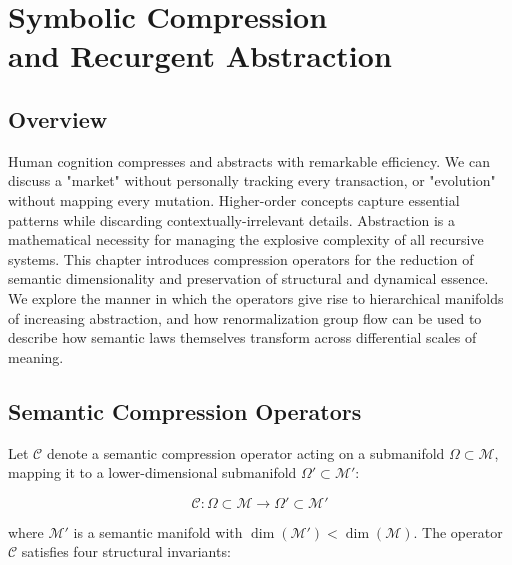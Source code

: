 \chapter{Symbolic Compression \\ and Recurgent Abstraction}

\section{Overview}

Human cognition compresses and abstracts with remarkable efficiency. We can discuss a "market" without personally tracking every transaction, or "evolution" without mapping every mutation. Higher-order concepts capture essential patterns while discarding contextually-irrelevant details. Abstraction is a mathematical necessity for managing the explosive complexity of all recursive systems. This chapter introduces compression operators for the reduction of semantic dimensionality and preservation of structural and dynamical essence. We explore the manner in which the operators give rise to hierarchical manifolds of increasing abstraction, and how renormalization group flow can be used to describe how semantic laws themselves transform across differential scales of meaning.

\section{Semantic Compression Operators}

Let \(\mathcal{C}\) denote a semantic compression operator acting on a submanifold \(\Omega \subset \mathcal{M}\), mapping it to a lower-dimensional submanifold \(\Omega' \subset \mathcal{M}'\):

\begin{equation}
\mathcal{C}: \Omega \subset \mathcal{M} \longrightarrow \Omega' \subset \mathcal{M}'
\end{equation}

where \(\mathcal{M}'\) is a semantic manifold with \(\dim(\mathcal{M}') < \dim(\mathcal{M})\). The operator \(\mathcal{C}\) satisfies four structural invariants:

